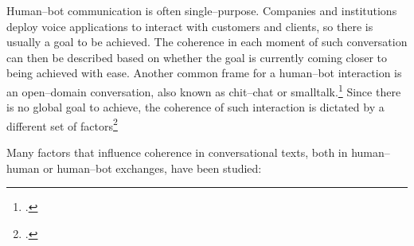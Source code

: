 \documentclass[12pt]{report}
\begin{document}
\par
Human–bot communication is often single–purpose.
Companies and institutions deploy voice applications to interact with customers and clients,
so there is usually a goal to be achieved.
The coherence in each moment of such conversation can then be described based on whether
the goal is currently coming closer to being achieved with ease.
Another common frame for a human–bot interaction is an open–domain conversation,
also known as chit–chat or smalltalk.\footcite{ramnauth2024chitchatdevelopingrobotssmalltalk}
Since there is no global goal to achieve,
the coherence of such interaction is dictated by
a different set of factors\footcite{xu-etal-2021-discovering}

\par
Many factors that influence coherence in conversational texts,
both in human–human or human–bot exchanges,
have been studied:
\end{document}
